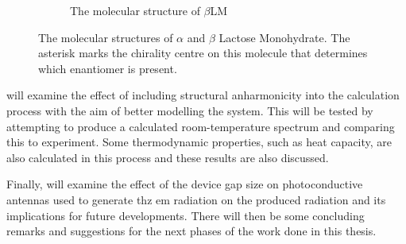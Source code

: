 \begin{figure}[h]
\begin{subfigure}{0.49\textwidth}
\captionsetup{font = footnotesize, justification = centering}
\caption{The molecular structure of ${\beta}$LM}
\label{fig:bLMStruct}
\end{subfigure}
\captionsetup{font = footnotesize, justification = centering}
\caption[The Molecular Structures of \(\alpha\) and \(\beta\) Lactose Monohydrate]{The molecular structures of \(\alpha\) and \(\beta\) Lactose Monohydrate. The asterisk marks the chirality centre on this molecule that determines which enantiomer is present.}
\label{fig:aLMbLMStructures}
\end{figure}

 will examine the effect of including structural anharmonicity into the calculation process with the aim of better modelling the system. This will be tested by attempting to produce a calculated room\nobreakdash-temperature spectrum and comparing this to experiment. Some thermodynamic properties, such as heat capacity, are also calculated in this process and these results are also discussed.
 
Finally,  will examine the effect of the device gap size on photoconductive antennas used to generate \acrshort{thz} \acrshort{em} radiation on the produced radiation and its implications for future developments. There will then be some concluding remarks and suggestions for the next phases of the work done in this thesis.